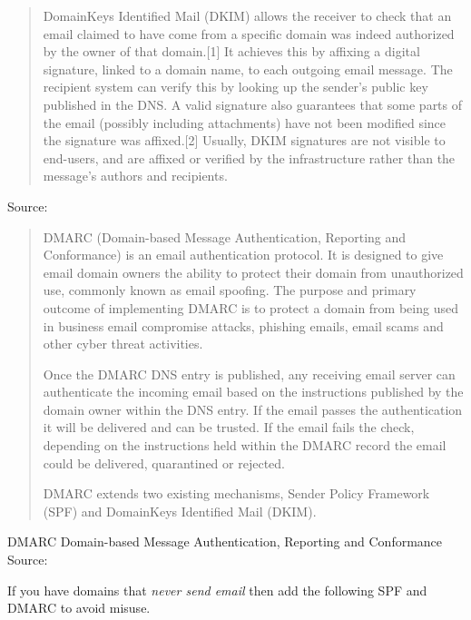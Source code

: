 \documentclass[Screen16to9,17pt]{foils}
\begin{document}
\begin{quote}
DomainKeys Identified Mail (DKIM) allows the receiver to check that an email claimed to have come from a specific domain was indeed authorized by the owner of that domain.[1] It achieves this by affixing a digital signature, linked to a domain name, to each outgoing email message. The recipient system can verify this by looking up the sender's public key published in the DNS. A valid signature also guarantees that some parts of the email (possibly including attachments) have not been modified since the signature was affixed.[2] Usually, DKIM signatures are not visible to end-users, and are affixed or verified by the infrastructure rather than the message's authors and recipients.
\end{quote}

Source: \\{\footnotesize
{}}


\begin{quote}\footnotesize
DMARC (Domain-based Message Authentication, Reporting and Conformance) is an email authentication protocol. It is designed to give email domain owners the ability to protect their domain from unauthorized use, commonly known as email spoofing. The purpose and primary outcome of implementing DMARC is to protect a domain from being used in business email compromise attacks, phishing emails, email scams and other cyber threat activities.

Once the DMARC DNS entry is published, any receiving email server can authenticate the incoming email based on the instructions published by the domain owner within the DNS entry. If the email passes the authentication it will be delivered and can be trusted. If the email fails the check, depending on the instructions held within the DMARC record the email could be delivered, quarantined or rejected.

DMARC extends two existing mechanisms, Sender Policy Framework (SPF) and DomainKeys Identified Mail (DKIM).
\end{quote}
DMARC Domain-based Message Authentication, Reporting and Conformance\\
Source: \\{\footnotesize
{}}


If you have domains that \emph{never send email} then add the following SPF and DMARC to avoid misuse.
\end{document}
